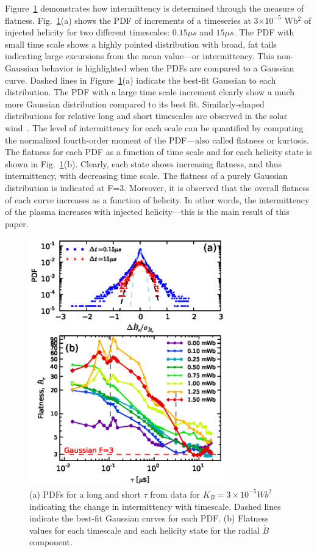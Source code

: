 \documentclass[aps,prl,amsmath,amssymb,reprint,superscriptaddress]{revtex4-1} %
\begin{document}
Figure~\ref{fig:Br_flatness} demonstrates how intermittency is determined through the measure of flatness.  Fig.~\ref{fig:Br_flatness}(a) shows the PDF of increments of a timeseries at 3$\times 10^{-5}$ Wb$^{2}$ of injected helicity for two different timescales: $0.15\mu s$ and $15\mu s$.  The PDF with small time scale shows a highly pointed distribution with broad, fat tails indicating large excursions from the mean value---or intermittency. This non-Gaussian behavior is highlighted when the PDFs are compared to a Gaussian curve. Dashed lines in Figure~\ref{fig:Br_flatness}(a) indicate the best-fit Gaussian to each distribution. The PDF with a large time scale increment clearly show a much more Gaussian distribution compared to its best fit. Similarly-shaped distributions for relative long and short timescales are observed in the solar wind~\cite{sorrisovalvo99}. The level of intermittency for each scale can be quantified by computing the normalized fourth-order moment of the PDF---also called flatness or kurtosis. The flatness for each PDF as a function of time scale and for each helicity state is shown in Fig.~\ref{fig:Br_flatness}(b). Clearly, each state shows increasing flatness, and thus intermittency, with decreasing time scale. The flatness of a purely Gaussian distribution is indicated at F=3. Moreover, it is observed that the overall flatness of each curve increases as a function of helicity. In other words, the intermittency of the plasma increases with injected helicity---this is the main result of this paper.

\begin{figure}[!htbp]
\centerline{
\includegraphics[width=8.5cm]{figure3.eps}}
\caption{\label{fig:Br_flatness} (a) PDFs for a long and short $\tau$ from data for $K_{B} = 3\times 10^{-5} Wb^{2}$ indicating the change in intermittency with timescale. Dashed lines indicate the best-fit Gaussian curves for each PDF. (b) Flatness values for each timescale and each helicity state for the radial $\dot{B}$ component.}
\end{figure}
\end{document}
